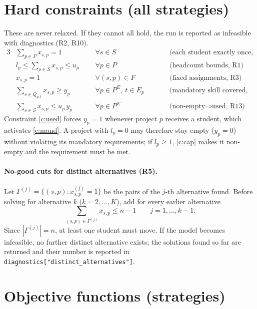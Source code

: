 \documentclass[11pt,a4paper]{article}
\begin{document}
\section{Hard constraints (all strategies)}
These are never relaxed. If they cannot all hold, the run is reported as infeasible with diagnostics
(R2, R10).
\begin{alignat}{3}
& \sum_{p \in P} x_{s,p} = 1 && \forall s \in S && \text{(each student exactly once, R1)} \label{c:one}\\
& l_p \le \sum_{s \in S} x_{s,p} \le u_p && \forall p \in P && \text{(headcount bounds, R1)} \label{c:cap}\\
& x_{s,p} = 1 && \forall (s,p) \in F && \text{(fixed assignments, R3)} \label{c:fix}\\
& \sum_{s \in Q_{p,t}} x_{s,p} \ge y_p \qquad && \forall p \in P^{E},\ t \in E_p \qquad && \text{(mandatory skill covered, R13)} \label{c:mand}\\
& \sum_{s \in S} x_{s,p} \le u_p \, y_p && \forall p \in P^{E} && \text{(non-empty} \Rightarrow \text{used, R13)} \label{c:used}
\end{alignat}
Constraint \eqref{c:used} forces $y_p = 1$ whenever project $p$ receives a student, which activates \eqref{c:mand}. A project
with $l_p = 0$ may therefore stay empty ($y_p = 0$) without violating its mandatory requirements; if
$l_p \ge 1$, \eqref{c:cap} makes it non-empty and the requirement must be met.

\paragraph{No-good cuts for distinct alternatives (R5).} Let $\Gamma^{(j)} = \{(s,p) : x^{(j)}_{s,p} = 1\}$ be the pairs of the
$j$-th alternative found. Before solving for alternative $k$ ($k = 2,\dots,K$), add for every earlier alternative
\begin{equation}
\sum_{(s,p) \in \Gamma^{(j)}} x_{s,p} \le n - 1 \qquad j = 1,\dots,k-1. \label{c:cut}
\end{equation}
Since $|\Gamma^{(j)}| = n$, at least one student must move. If the model becomes infeasible, no further
distinct alternative exists; the solutions found so far are returned and their number is reported in
\texttt{diagnostics["distinct\_alternatives"]}.

\section{Objective functions (strategies)}
\end{document}

